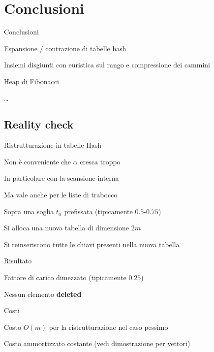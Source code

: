 \section{Conclusioni}

\begin{frame}{Conclusioni}
\BIL
\item Espansione / contrazione di tabelle hash
\item Insiemi disgiunti con euristica sul rango e compressione dei cammini
\item Heap di Fibonacci
\item \ldots
\EIL
	
\end{frame}

\subsection{Reality check}


\begin{frame}{Ristrutturazione in tabelle Hash}

\vspace{-9pt}
\BIL
\item Non è conveniente che $\alpha$ cresca troppo
	\BI
	\item In particolare con la scansione interna
	\item Ma vale anche per le liste di trabocco
	\EI
\item Sopra una soglia $t_\alpha$ prefissata (tipicamente $0.5$-$0.75$)
\BI
\item  Si alloca una nuova tabella di dimensione $2m$
\item Si reinseriscono tutte le chiavi presenti nella nuova tabella
\EI
\item Risultato
\BI
	\item Fattore di carico dimezzato (tipicamente $0.25$)
	\item Nessun elemento \textbf{deleted}
\EI
\item Costi
\BI
\item Costo $O(m)$ per la ristrutturazione nel caso pessimo
\item Costo ammortizzato costante (vedi dimostrazione per vettori)
\EI
\EIL

\end{frame}

